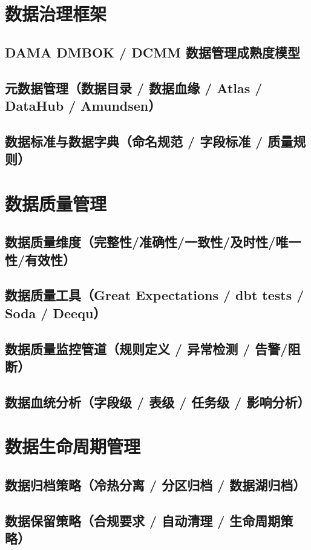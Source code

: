 \documentclass[12pt,UTF8]{ctexbook}
\begin{document}
  \section{数据治理框架}
    \subsection{DAMA DMBOK / DCMM 数据管理成熟度模型}
    \subsection{元数据管理（数据目录 / 数据血缘 / Atlas / DataHub / Amundsen）}
    \subsection{数据标准与数据字典（命名规范 / 字段标准 / 质量规则）}

  \section{数据质量管理}
    \subsection{数据质量维度（完整性/准确性/一致性/及时性/唯一性/有效性）}
    \subsection{数据质量工具（Great Expectations / dbt tests / Soda / Deequ）}
    \subsection{数据质量监控管道（规则定义 / 异常检测 / 告警/阻断）}
    \subsection{数据血统分析（字段级 / 表级 / 任务级 / 影响分析）}

  \section{数据生命周期管理}
    \subsection{数据归档策略（冷热分离 / 分区归档 / 数据湖归档）}
    \subsection{数据保留策略（合规要求 / 自动清理 / 生命周期策略）}
\end{document}
